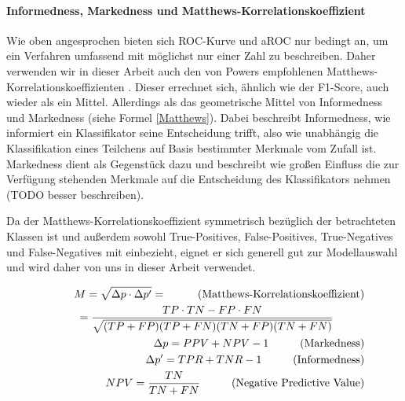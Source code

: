 \paragraph{Informedness, Markedness und Matthews-Korrelationskoeffizient}

Wie oben angesprochen bieten sich ROC-Kurve und aROC nur bedingt an, um ein Verfahren umfassend mit möglichst nur einer Zahl zu beschreiben. Daher verwenden wir in dieser Arbeit auch den von Powers empfohlenen Matthews-Korrelationskoeffizienten  \cite{Powers2011}\cite{Matthews1975}. Dieser errechnet sich, ähnlich wie der F1-Score, auch wieder als ein Mittel. Allerdings als das geometrische Mittel von Informedness und Markedness (siehe Formel \ref{Matthews}). Dabei beschreibt Informedness, wie informiert ein Klassifikator seine Entscheidung trifft, also wie unabhängig die Klassifikation eines Teilchens auf Basis bestimmter Merkmale vom Zufall ist. Markedness dient als Gegenstück dazu und beschreibt wie großen Einfluss die zur Verfügung stehenden Merkmale auf die Entscheidung des Klassifikators nehmen (TODO besser beschreiben).

Da der Matthews-Korrelationskoeffizient symmetrisch bezüglich der betrachteten Klassen ist und außerdem sowohl True-Positives, False-Positives, True-Negatives und False-Negatives mit einbezieht, eignet er sich generell gut zur Modellauswahl und wird daher von uns in dieser Arbeit verwendet.

\begin{eqnarray} \label{Matthews}
    \hspace{1cm} M = \sqrt{\Delta p \cdot \Delta p'} = \text{\hspace{1cm}(Matthews-Korrelationskoeffizient)} \\
    =\frac{TP \cdot TN - FP \cdot FN}{\sqrt{(TP + FP)(TP + FN)(TN + FP)(TN + FN)}} \hspace{1cm} \\
    \hspace{1cm} \Delta p = PPV + NPV - 1 \text{\hspace{1cm}(Markedness)} \\
    \hspace{1cm} \Delta p' = TPR + TNR - 1 \text{\hspace{1cm}(Informedness)} \\
    \hspace{1cm} NPV = \frac{TN}{TN + FN} \text{\hspace{1cm}(Negative Predictive Value)}
\end{eqnarray}



